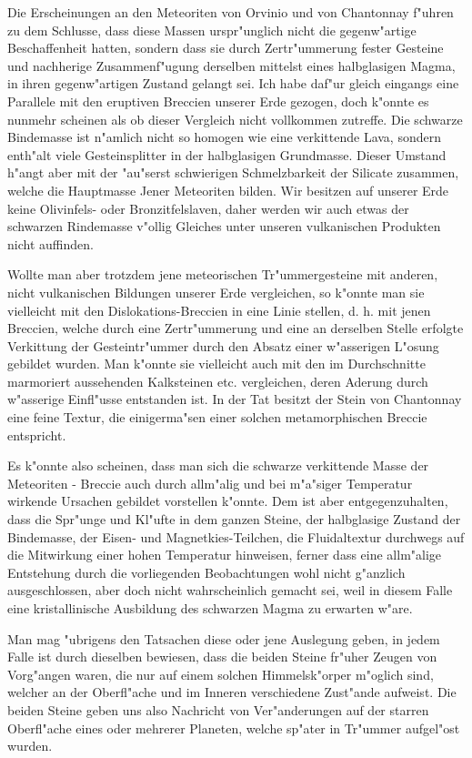 \documentclass[a4paper, 11pt, oneside]{article}
\begin{document}
Die Erscheinungen an den Meteoriten von Orvinio und von Chantonnay f"uhren zu dem Schlusse, dass diese Massen urspr"unglich nicht die gegenw"artige Beschaffenheit hatten, sondern dass sie durch Zertr"ummerung fester Gesteine und nachherige Zusammenf"ugung derselben mittelst eines halbglasigen Magma, in ihren gegenw"artigen Zustand gelangt sei. Ich habe daf"ur gleich eingangs eine Parallele mit den eruptiven Breccien unserer Erde gezogen, doch k"onnte es nunmehr scheinen als ob dieser Vergleich nicht vollkommen zutreffe. Die schwarze Bindemasse ist n"amlich nicht so homogen wie eine verkittende Lava, sondern enth"alt viele Gesteinsplitter in der halbglasigen Grundmasse. Dieser Umstand h"angt aber mit der "au"serst schwierigen Schmelzbarkeit der Silicate zusammen, welche die Hauptmasse Jener Meteoriten bilden. Wir besitzen auf unserer Erde keine Olivinfels- oder Bronzitfelslaven, daher werden wir auch etwas der schwarzen Rindemasse v"ollig Gleiches unter unseren vulkanischen Produkten nicht auffinden.

Wollte man aber trotzdem jene meteorischen Tr"ummergesteine mit anderen, nicht vulkanischen Bildungen unserer Erde vergleichen, so k"onnte man sie vielleicht mit den Dislokations-Breccien in eine Linie stellen, d. h. mit jenen Breccien, welche durch eine Zertr"ummerung und eine an derselben Stelle erfolgte Verkittung der Gesteintr"ummer durch den Absatz einer w"asserigen L"osung gebildet wurden. Man k"onnte sie vielleicht auch mit den im Durchschnitte marmoriert aussehenden Kalksteinen etc. vergleichen, deren Aderung durch w"asserige Einfl"usse entstanden ist. In der Tat besitzt der Stein von Chantonnay eine feine Textur, die einigerma"sen einer solchen metamorphischen Breccie entspricht.

Es k"onnte also scheinen, dass man sich die schwarze verkittende Masse der Meteoriten - Breccie auch durch allm"alig und bei m"a"siger Temperatur wirkende Ursachen gebildet vorstellen k"onnte. Dem ist aber entgegenzuhalten, dass die Spr"unge und Kl"ufte in dem ganzen Steine, der halbglasige Zustand der Bindemasse, der Eisen- und Magnetkies-Teilchen, die Fluidaltextur durchwegs auf die Mitwirkung einer hohen Temperatur hinweisen, ferner dass eine allm"alige Entstehung durch die vorliegenden Beobachtungen wohl nicht g"anzlich ausgeschlossen, aber doch nicht wahrscheinlich gemacht sei, weil in diesem Falle eine kristallinische Ausbildung des schwarzen Magma zu erwarten w"are.

Man mag "ubrigens den Tatsachen diese oder jene Auslegung geben, in jedem Falle ist durch dieselben bewiesen, dass die beiden Steine fr"uher Zeugen von Vorg"angen waren, die nur auf einem solchen Himmelsk"orper m"oglich sind, welcher an der Oberfl"ache und im Inneren verschiedene Zust"ande aufweist. Die beiden Steine geben uns also Nachricht von Ver"anderungen auf der starren Oberfl"ache eines oder mehrerer Planeten, welche sp"ater in Tr"ummer aufgel"ost wurden.
\clearpage
\end{document}
